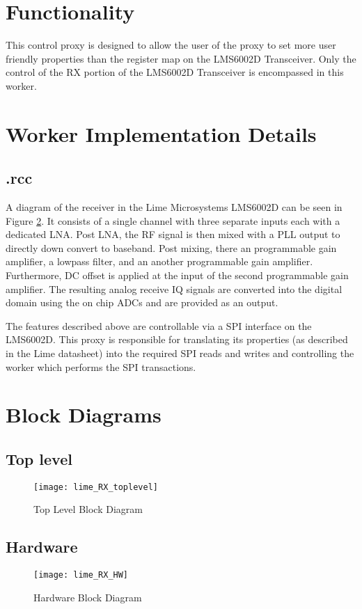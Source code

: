 \section*{Functionality}
This control proxy is designed to allow the user of the proxy to set more user friendly properties than the register map on the LMS6002D Transceiver.  Only the control of the RX portion of the LMS6002D Transceiver is encompassed in this worker.

\section*{Worker Implementation Details}
\subsection*{\comp.rcc}
A diagram of the receiver in the Lime Microsystems LMS6002D can be seen in Figure \ref{fig:hw}. It consists of a single channel with three separate inputs each with a dedicated LNA. Post LNA, the RF signal is then mixed with a PLL output to directly down convert to baseband. Post mixing, there an programmable gain amplifier, a lowpass filter, and an another programmable gain amplifier. Furthermore, DC offset is applied at the input of the second programmable gain amplifier. The resulting analog receive IQ signals are converted into the digital domain using the on chip ADCs and are provided as an output.\par\medskip
\noindent The features described above are controllable via a SPI interface on the LMS6002D. This proxy is responsible for translating its properties (as described in the Lime datasheet) into the required SPI reads and writes and controlling the worker which performs the SPI transactions.
\newpage

\section*{Block Diagrams}
\subsection*{Top level}
\begin{figure}[ht]
	\centerline{\texttt{[image: lime\_RX\_toplevel]}}
	\caption{Top Level Block Diagram}
	\label{fig:top}
\end{figure}
\vspace{25 mm}

\subsection*{Hardware}
\begin{figure}[ht]
	\centerline{\texttt{[image: lime\_RX\_HW]}}
	\caption{Hardware Block Diagram}
	\label{fig:hw}
\end{figure}
\vspace{25 mm}

